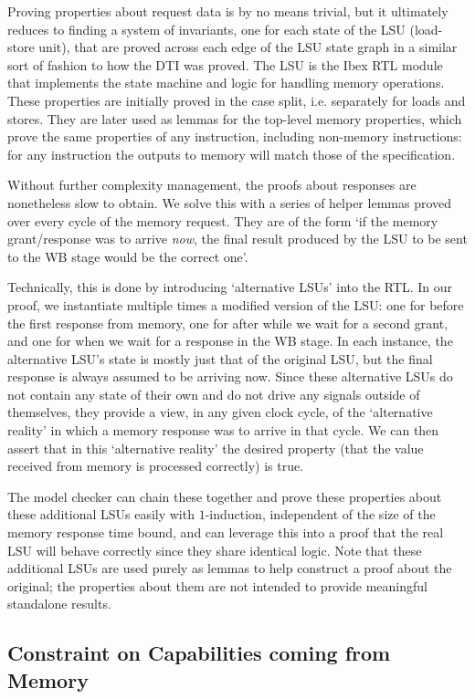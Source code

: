 \documentclass[10pt,conference]{IEEEtran}
\begin{document}
Proving properties about request data is by no means trivial, but it
ultimately reduces to finding a system of invariants, one for each state of
the LSU (load-store unit), that are proved across each edge of the LSU
state graph in a similar sort of fashion to how the DTI was proved.  The
LSU is the Ibex RTL module that implements the state machine and logic for
handling memory operations. These properties are initially proved in the
case split, i.e. separately for loads and stores. They are later used as 
lemmas for the top-level memory properties, which prove the same properties
of any instruction, including non-memory instructions: for any
instruction the outputs to memory will match those of the specification.

Without further complexity management, the proofs about responses are
nonetheless slow to obtain. We solve this with a series of helper lemmas proved over
every cycle of the memory request. They are of the form `if the memory grant/response was
to arrive \textit{now}, the final result produced by the LSU to be sent to the WB stage
would be the correct one'.

Technically, this is done by introducing `alternative LSUs' into the RTL.
In our proof, we instantiate multiple times a modified version of the LSU:
one for before the first response from memory, one for after while we wait
for a second grant, and one for when we wait for a response in the WB stage.
In each instance, the alternative LSU's state is mostly just that
of the original LSU, but the final response is always assumed to be
arriving now. Since these alternative LSUs do not
contain any state of their own and do not drive any signals outside of
themselves, they provide a view, in any given clock cycle, of the
`alternative reality' in which a memory response was to arrive in that
cycle.  We can then assert that in this `alternative reality' the desired
property (that the value received from memory is processed correctly) is
true.

The model checker can chain these together and prove these properties about these additional LSUs
easily with $1$-induction, independent of the size of the memory response time bound,
and can leverage this into a proof that the real LSU will behave correctly since they
share identical logic. Note that these additional LSUs are used purely as lemmas to
help construct a proof about the original; the properties about them are not intended
to provide meaningful standalone results.

\subsection{Constraint on Capabilities coming from Memory}\label{src:memconstrain}
\end{document}

